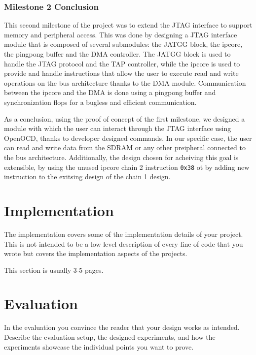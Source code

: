 \documentclass[a4paper,11pt,oneside]{report}
\begin{document}

\subsection{Milestone 2 Conclusion}

This second milestone of the project was to extend the JTAG interface to support memory and peripheral access.
This was done by designing a JTAG interface module that is composed of several submodules: the JATGG block, the ipcore, the pingpong buffer and the DMA controller.
The JATGG block is used to handle the JTAG protocol and the TAP controller, while the ipcore is used to provide and handle instructions
that allow the user to execute read and write operations on the bus architecture thanks to the DMA module. 
Communication between the ipcore and the DMA is done using a pingpong buffer and synchronization flops for a bugless and efficient communication.

As a conclusion, using the proof of concept of the first milestone, 
we designed a module with which the user can interact through the JTAG interface using OpenOCD, thanks to developer designed commands.
In our specific case, the user can read and write data from the SDRAM or any other preipheral connected to the bus architecture. 
Additionally, the design chosen for acheiving this goal is extensible, by using the unused ipcore chain 2 instruction \texttt{0x38} ot by adding new instruction to the 
exitsing design of the chain 1 design.

\chapter{Implementation}

The implementation covers some of the implementation details of your project.
This is not intended to be a low level description of every line of code that
you wrote but covers the implementation aspects of the projects.

This section is usually 3-5 pages.


\chapter{Evaluation}

In the evaluation you convince the reader that your design works as intended.
Describe the evaluation setup, the designed experiments, and how the
experiments showcase the individual points you want to prove.
\end{document}
